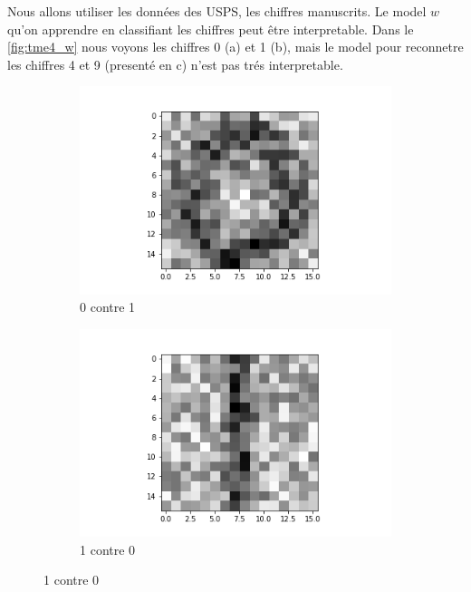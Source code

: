 \documentclass[a4paper,12pt]{article}
\begin{document}
Nous allons utiliser les données des USPS, les chiffres manuscrits. Le model $w$ qu'on apprendre en classifiant les
chiffres peut être interpretable. Dans le \autoref{fig:tme4_w} nous voyons les chiffres 0 (a) et 1 (b),
mais le model pour reconnetre les chiffres 4 et 9 (presenté en c) n'est pas trés interpretable.

\begin{figure}[h!]
\caption{Le model w dans perceptron}
\label{fig:tme4_w}
\begin{subfigure}{.33\textwidth}
	\centering
	\includegraphics[width=\linewidth]{images/tme4/weight_w0.png}
	\caption{0 contre 1}
\end{subfigure}%
\begin{subfigure}{.33\textwidth}
  \centering
	\includegraphics[width=\linewidth]{images/tme4/weight_w1.png}
	\caption{1 contre 0}
\end{subfigure}

\end{figure}
\end{document}
